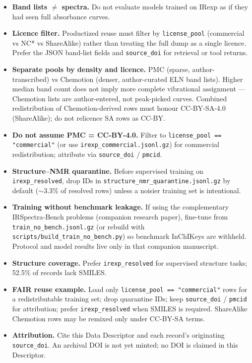 \documentclass[pdflatex,sn-nature]{sn-jnl}
\begin{document}
\begin{itemize}
  \item \textbf{Band lists $\neq$ spectra.} Do not evaluate models trained on IRexp as
        if they had seen full absorbance curves.
  \item \textbf{Licence filter.} Productized reuse must filter by
        \texttt{license\_pool} (commercial vs NC* vs ShareAlike) rather than
        treating the full dump as a single licence.
        Prefer the JSON band-list fields and \texttt{source\_doi} for retrieval
        or tool returns.
  \item \textbf{Separate pools by density and licence.} PMC (sparse, author-transcribed)
        vs Chemotion (denser, author-curated ELN band lists).
        Higher median band count does not imply more complete vibrational
        assignment --- Chemotion lists are author-entered, not peak-picked curves.
        Combined redistribution of Chemotion-derived rows must honour CC-BY-SA-4.0
        (ShareAlike); do not relicence SA rows as CC-BY.
  \item \textbf{Do not assume PMC = CC-BY-4.0.} Filter to
        \texttt{license\_pool == "commercial"} (or use \texttt{irexp\_commercial.jsonl.gz})
        for commercial redistribution; attribute via \texttt{source\_doi} / \texttt{pmcid}.
  \item \textbf{Structure--NMR quarantine.} Before supervised training on
        \texttt{irexp\_resolved}, drop IDs in
        \texttt{structure\_nmr\_quarantine.jsonl.gz} by default
        ($\sim$3.3\% of resolved rows) unless a noisier training set is intentional.
  \item \textbf{Training without benchmark leakage.} If using the complementary
        IRSpectra-Bench problems (companion research paper), fine-tune from
        \texttt{train\_no\_bench.jsonl.gz} (or rebuild with
        \texttt{scripts/build\_train\_no\_bench.py}) so benchmark InChIKeys are withheld.
        Protocol and model results live only in that companion manuscript.
  \item \textbf{Structure coverage.} Prefer \texttt{irexp\_resolved} for supervised
        structure tasks; 52.5\% of records lack SMILES.
  \item \textbf{FAIR reuse example.} Load only
        \texttt{license\_pool == "commercial"} rows for a redistributable training
        set; drop quarantine IDs; keep \texttt{source\_doi} / \texttt{pmcid} for
        attribution; prefer \texttt{irexp\_resolved} when SMILES is required.
        ShareAlike Chemotion rows may be remixed only under CC-BY-SA terms.
  \item \textbf{Attribution.} Cite this Data Descriptor and each record's
        originating \texttt{source\_doi}. An archival DOI is not yet minted; no
        DOI is claimed in this Descriptor.
\end{itemize}
\end{document}
